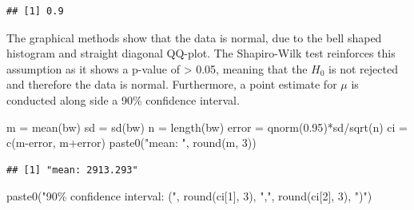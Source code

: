 \documentclass[
]{article}
\newenvironment{Shaded}{\begin{snugshade}}{\end{snugshade}}
\newcommand{\CommentTok}[1]{\textcolor[rgb]{0.56,0.35,0.01}{\textit{#1}}}
\newcommand{\DecValTok}[1]{\textcolor[rgb]{0.00,0.00,0.81}{#1}}
\newcommand{\FloatTok}[1]{\textcolor[rgb]{0.00,0.00,0.81}{#1}}
\newcommand{\FunctionTok}[1]{\textcolor[rgb]{0.00,0.00,0.00}{#1}}
\newcommand{\NormalTok}[1]{#1}
\newcommand{\OtherTok}[1]{\textcolor[rgb]{0.56,0.35,0.01}{#1}}
\newcommand{\SpecialCharTok}[1]{\textcolor[rgb]{0.00,0.00,0.00}{#1}}
\newcommand{\StringTok}[1]{\textcolor[rgb]{0.31,0.60,0.02}{#1}}
\begin{document}
\begin{Shaded}
\end{Shaded}

\begin{verbatim}
## [1] 0.9
\end{verbatim}

The graphical methods show that the data is normal, due to the bell
shaped histogram and straight diagonal QQ-plot. The Shapiro-Wilk test
reinforces this assumption as it shows a p-value of \textgreater{} 0.05,
meaning that the \(H_0\) is not rejected and therefore the data is
normal. Furthermore, a point estimate for \(\mu\) is conducted along
side a 90\% confidence interval.

\begin{Shaded}
\begin{Highlighting}[]
\NormalTok{m }\OtherTok{=} \FunctionTok{mean}\NormalTok{(bw)}
\NormalTok{sd }\OtherTok{=} \FunctionTok{sd}\NormalTok{(bw)}
\NormalTok{n }\OtherTok{=} \FunctionTok{length}\NormalTok{(bw)}
\NormalTok{error }\OtherTok{=} \FunctionTok{qnorm}\NormalTok{(}\FloatTok{0.95}\NormalTok{)}\SpecialCharTok{*}\NormalTok{sd}\SpecialCharTok{/}\FunctionTok{sqrt}\NormalTok{(n)}
\NormalTok{ci }\OtherTok{=} \FunctionTok{c}\NormalTok{(m}\SpecialCharTok{{-}}\NormalTok{error, m}\SpecialCharTok{+}\NormalTok{error)}
\FunctionTok{paste0}\NormalTok{(}\StringTok{"mean: "}\NormalTok{, }\FunctionTok{round}\NormalTok{(m, }\DecValTok{3}\NormalTok{))}
\end{Highlighting}
\end{Shaded}

\begin{verbatim}
## [1] "mean: 2913.293"
\end{verbatim}

\begin{Shaded}
\begin{Highlighting}[]
\FunctionTok{paste0}\NormalTok{(}\StringTok{"90\% confidence interval: ("}\NormalTok{, }\FunctionTok{round}\NormalTok{(ci[}\DecValTok{1}\NormalTok{], }\DecValTok{3}\NormalTok{), }\StringTok{","}\NormalTok{, }\FunctionTok{round}\NormalTok{(ci[}\DecValTok{2}\NormalTok{], }\DecValTok{3}\NormalTok{), }\StringTok{")"}\NormalTok{)}
\end{Highlighting}
\end{Shaded}
\end{document}
